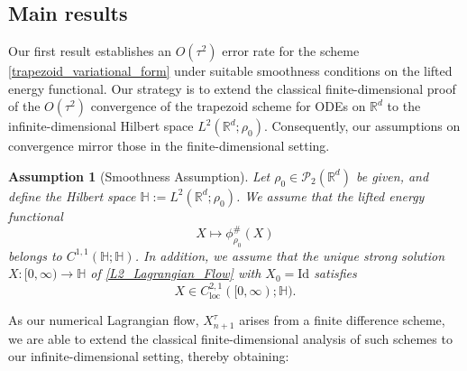 \documentclass[11pt,a4paper]{amsart}
\newcommand{\1}{\mathds{1}}
\newcommand{\R}{{\mathbb R}}
\newtheorem{assumption}{\textbf{Assumption}}
\numberwithin{equation}{section}
\begin{document}
 



\subsection{Main results}

Our first result establishes an $O(\tau^2)$ error rate for the scheme \eqref{trapezoid_variational_form} under suitable smoothness conditions on the lifted energy functional. Our strategy is to extend the classical finite-dimensional proof of the $O(\tau^2)$ convergence of the trapezoid scheme for ODEs on $\mathbb{R}^d$ to the infinite-dimensional Hilbert space $L^2(\R^d;\rho_0)$. Consequently, our assumptions on convergence mirror those in the finite-dimensional setting.

\begin{assumption}[Smoothness Assumption] \label{smoothness_assumption}
Let $\rho_0 \in \mathcal{P}_2(\mathbb{R}^d)$ be given, and define the Hilbert space $\mathbb{H} := L^2(\mathbb{R}^d; \rho_0)$.  
We assume that the lifted energy functional
\[
    X \mapsto \phi^{\#}_{\rho_0}(X)
\]
belongs to $C^{1,1}(\mathbb{H}; \mathbb{H})$.  
In addition, we assume that the unique strong solution $X : [0, \infty) \to \mathbb{H}$ of \eqref{L2_Lagrangian_Flow} with $X_0 = \mathrm{Id}$ satisfies
\[
    X \in C^{2,1}_{\mathrm{loc}}([0, \infty); \mathbb{H}).
\] 
\end{assumption}




As our numerical Lagrangian flow, \( X^{\tau}_{n+1} \) arises from a finite difference scheme, we are able to extend the classical finite-dimensional analysis of such schemes to our infinite-dimensional setting, thereby obtaining: 
\end{document}
